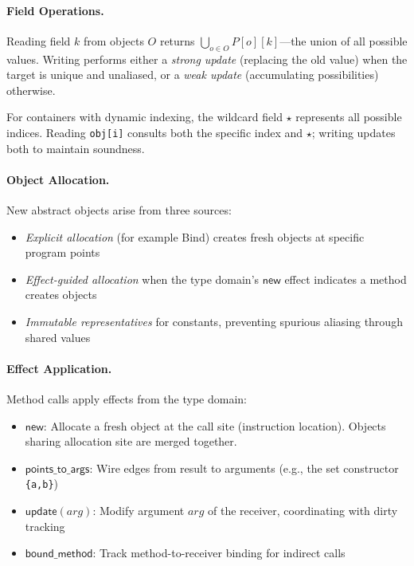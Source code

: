 \paragraph{Field Operations.}
Reading field $k$ from objects $O$ returns $\bigcup_{o \in O} P[o][k]$---the union of all possible values. Writing performs either a \emph{strong update} (replacing the old value) when the target is unique and unaliased, or a \emph{weak update} (accumulating possibilities) otherwise.

For containers with dynamic indexing, the wildcard field $\star$ represents all possible indices. Reading \texttt{obj[i]} consults both the specific index and $\star$; writing updates both to maintain soundness.

\paragraph{Object Allocation.}
New abstract objects arise from three sources:
\begin{itemize}
\item \emph{Explicit allocation} (for example \textsf{Bind}) creates fresh objects at specific program points
\item \emph{Effect-guided allocation} when the type domain's $\mathsf{new}$ effect indicates a method creates objects  
\item \emph{Immutable representatives} for constants, preventing spurious aliasing through shared values
\end{itemize}

\paragraph{Effect Application.}
Method calls apply effects from the type domain:
\begin{itemize}
\item $\mathsf{new}$: Allocate a fresh object at the call site (instruction location). Objects sharing allocation site are merged together.
\item $\mathsf{points\_to\_args}$: Wire edges from result to arguments (e.g., the set constructor \texttt{\{a,b\}})
\item $\mathsf{update}(arg)$: Modify argument $arg$ of the receiver, coordinating with dirty tracking
\item $\mathsf{bound\_method}$: Track method-to-receiver binding for indirect calls
\end{itemize}

